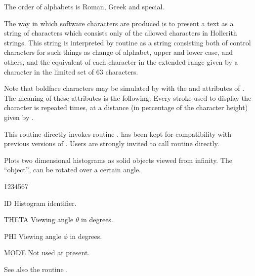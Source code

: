 \begin{UL}
\item The order of alphabets is Roman, Greek and special.
\item The way in which software characters are produced is to present a text as
      a string of characters which consists only of the allowed characters in 
      Hollerith strings. This string is interpreted by routine  as
      a string consisting both of control characters for such things as change 
      of alphabet, upper and lower case, and others, and the equivalent of each 
      character in the extended range given by a character in the limited set of
      63 characters.
\item Note that boldface characters may be simulated by with the 
       and  attributes of . The meaning of these 
      attributes is the following: Every stroke used to display the character is
      repeated  times, at a distance (in percentage of the character 
      height) given by .
\item This routine directly invokes \HIGZ{} routine . 
      has been kept for compatibility with previous versions of \HPLOT. Users 
      are strongly invited to call \HIGZ{} routine  directly.
\end{UL}


\Action
Plots two dimensional histograms as solid objects viewed from infinity. The 
``object'', can be rotated over a certain angle.
\Pdesc
\begin{DLtt}{1234567}
\item[ID]    Histogram identifier.
\item[THETA] Viewing angle $\theta$ in degrees.
\item[PHI]   Viewing angle $\phi$ in degrees.
\item[MODE]  Not used at present.
\end{DLtt}
\Remark
See also the routine .


